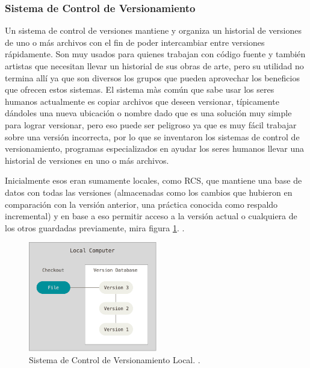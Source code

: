 \subsubsection{Sistema de Control de Versionamiento}
Un sistema de control de versiones mantiene y organiza un historial de versiones de uno o más archivos con el fin de poder intercambiar entre versiones rápidamente. Son muy usados para quienes trabajan con código fuente y también artistas \citep{PROGIT-Git-VCS} que necesitan llevar un historial de sus obras de arte, pero su utilidad no termina allí ya que son diversos los grupos que pueden aprovechar los beneficios que ofrecen estos sistemas. El sistema màs común que sabe usar los seres humanos actualmente es copiar archivos que deseen versionar, típicamente dándoles una nueva ubicación o nombre dado que es una solución muy simple para lograr versionar, pero eso puede ser peligroso ya que es muy fácil trabajar sobre una versión incorrecta, por lo que se inventaron los sistemas de control de versionamiento, programas especializados en ayudar los seres humanos llevar una historial de versiones en uno o más archivos.

Inicialmente esos eran sumamente locales, como RCS, que mantiene una base de datos con todas las versiones (almacenadas como los cambios que hubieron en comparación con la versión anterior, una práctica conocida como respaldo incremental) y en base a eso permitir acceso a la versión actual o cualquiera de los otros guardadas previamente, mira figura \ref{LVCS}. \citep{PROGIT-Git-VCS}. 

\begin{figure}
  \begin{center}
    \includegraphics[width=0.5\textwidth]{Figures/lvcs.png}
  \end{center}
  \caption{Sistema de Control de Versionamiento Local. \citep{PROGIT-Git-VCS}.}
  \label{LVCS}
\end{figure}


